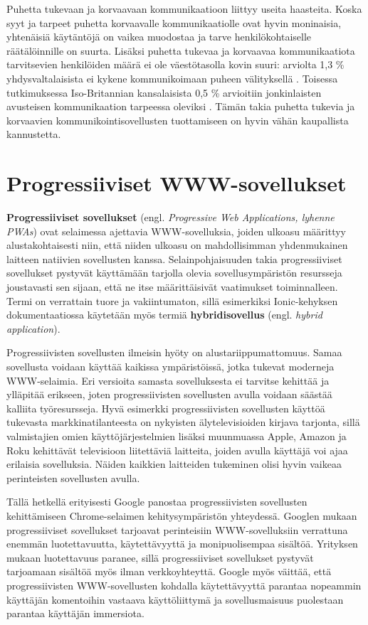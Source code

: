 \documentclass[utf8]{gradu3}
\begin{document}
Puhetta tukevaan ja korvaavaan kommunikaatioon liittyy useita haasteita. Koska syyt ja tarpeet puhetta korvaavalle kommunikaatiolle ovat hyvin moninaisia, yhtenäisiä käytäntöjä on vaikea muodostaa ja tarve henkilökohtaiselle räätälöinnille on suurta. Lisäksi puhetta tukevaa ja korvaavaa kommunikaatiota tarvitsevien henkilöiden määrä ei ole väestötasolla kovin suuri: arviolta 1,3 \% yhdysvaltalaisista ei kykene kommunikoimaan puheen välityksellä \parencite[]{AAC-support}. Toisessa tutkimuksessa Iso-Britannian kansalaisista 0,5 \% arvioitiin jonkinlaisten avusteisen kommunikaation tarpeessa oleviksi \parencite[]{AAC-need}. Tämän takia puhetta tukevia ja korvaavien kommunikointisovellusten tuottamiseen on hyvin vähän kaupallista kannustetta.

\section{Progressiiviset WWW-sovellukset}

\textbf{Progressiiviset sovellukset} (engl. \textit{Progressive Web Applications, lyhenne PWAs}) ovat selaimessa ajettavia WWW-sovelluksia, joiden ulkoasu määrittyy alustakohtaisesti niin, että niiden ulkoasu on mahdollisimman yhdenmukainen laitteen natiivien sovellusten kanssa. Selainpohjaisuuden takia progressiiviset sovellukset pystyvät käyttämään tarjolla olevia sovellusympäristön resursseja joustavasti sen sijaan, että ne itse määrittäisivät vaatimukset toiminnalleen. Termi on verrattain tuore ja vakiintumaton, sillä esimerkiksi Ionic-kehyksen dokumentaatiossa käytetään myös termiä \textbf{hybridisovellus} (engl. \textit{hybrid application}).

Progressiivisten sovellusten ilmeisin hyöty on alustariippumattomuus. Samaa sovellusta voidaan käyttää kaikissa ympäristöissä, jotka tukevat moderneja WWW-selaimia. Eri versioita samasta sovelluksesta ei tarvitse kehittää ja ylläpitää erikseen, joten progressiivisten sovellusten avulla voidaan säästää kalliita työresursseja. Hyvä esimerkki progressiivisten sovellusten käyttöä tukevasta markkinatilanteesta on nykyisten älytelevisioiden kirjava tarjonta, sillä valmistajien omien käyttöjärjestelmien lisäksi muunmuassa Apple, Amazon ja Roku kehittävät televisioon liitettäviä laitteita, joiden avulla käyttäjä voi ajaa erilaisia sovelluksia. Näiden kaikkien laitteiden tukeminen olisi hyvin vaikeaa perinteisten sovellusten avulla. \parencite[]{frankston-pwa}

Tällä hetkellä erityisesti Google panostaa progressiivisten sovellusten kehittämiseen Chrome-selaimen kehitysympäristön yhteydessä. Googlen \parencite[]{google-pwa-marketing} mukaan progressiiviset sovellukset tarjoavat perinteisiin WWW-sovelluksiin verrattuna enemmän luotettavuutta, käytettävyyttä ja monipuolisempaa sisältöä. Yrityksen mukaan luotettavuus paranee, sillä progressiiviset sovellukset pystyvät tarjoamaan sisältöä myös ilman verkkoyhteyttä. Google myös väittää, että progressiivisten WWW-sovellusten kohdalla käytettävyyttä parantaa nopeammin käyttäjän komentoihin vastaava käyttöliittymä ja sovellusmaisuus puolestaan parantaa käyttäjän immersiota.
\end{document}
